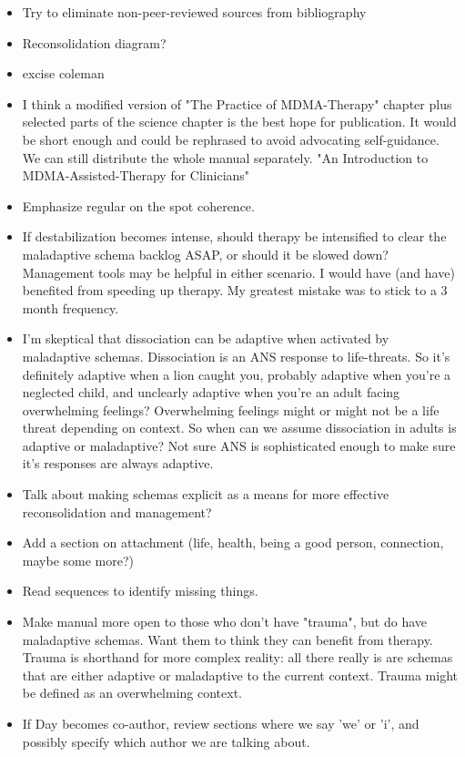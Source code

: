 \documentclass[12pt,letterpaper]{article}
\begin{document}
\begin{itemize}
    \item Try to eliminate non-peer-reviewed sources from bibliography
    \item Reconsolidation diagram?
    \item excise coleman
    \item I think a modified version of "The Practice of MDMA-Therapy" chapter plus selected parts of the science chapter is the best hope for publication. It would be short enough and could be rephrased to avoid advocating self-guidance. We can still distribute the whole manual separately. "An Introduction to MDMA-Assisted-Therapy for Clinicians"
    \item Emphasize regular on the spot coherence.
    \item If destabilization becomes intense, should therapy be intensified to clear the maladaptive schema backlog ASAP, or should it be slowed down? Management tools may be helpful in either scenario. I would have (and have) benefited from speeding up therapy. My greatest mistake was to stick to a 3 month frequency.
    \item I'm skeptical that dissociation can be adaptive when activated by maladaptive schemas. Dissociation is an ANS response to life-threats. So it's definitely adaptive when a lion caught you, probably adaptive when you're a neglected child, and unclearly adaptive when you're an adult facing overwhelming feelings? Overwhelming feelings might or might not be a life threat depending on context. So when can we assume dissociation in adults is adaptive or maladaptive? Not sure ANS is sophisticated enough to make sure it's responses are always adaptive.
    \item Talk about making schemas explicit as a means for more effective reconsolidation and management?
    \item Add a section on attachment (life, health, being a good person, connection, maybe some more?)
    \item Read sequences to identify missing things.
    \item Make manual more open to those who don't have "trauma", but do have maladaptive schemas. Want them to think they can benefit from therapy. Trauma is shorthand for more complex reality: all there really is are schemas that are either adaptive or maladaptive to the current context. Trauma might be defined as an overwhelming context.
    \item If Day becomes co-author, review sections where we say 'we' or 'i', and possibly specify which author we are talking about.

\end{itemize}
\end{document}
